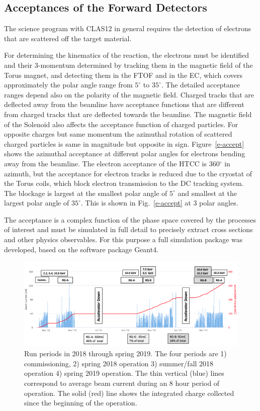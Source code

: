 \documentclass[final,3p,twocolumn]{elsarticle}
\begin{document}
\subsection{\rm Acceptances of the Forward Detectors} 
The science program with CLAS12 in general requires the detection of electrons that are scattered off the target material. 

For determining the kinematics of the reaction, the electrons must be identified and their 3-momentum determined by tracking
them in the magnetic field of the Torus magnet, and detecting them in the FTOF and in the EC, which covers approximately 
the polar angle range from $5^\circ$ to $35^\circ$. The detailed acceptance ranges depend also on the polarity of the 
magnetic field. Charged tracks that are deflected away from the beamline have acceptance functions
that are different from charged tracks that are deflected towards the beamline. The magnetic field of the Solenoid also affects
the acceptance function of charged particles. For opposite charges but same 
momentum the azimuthal rotation of scattered charged particles is same in magnitude but opposite in sign.  
Figure~\ref{e-accept} shows the azimuthal acceptance at different polar angles for electrons bending away from the beamline.  
The electron acceptance of the HTCC is 360$^\circ$ in azimuth, but the acceptance for electron tracks is reduced due to 
the cryostat of the Torus coils, which block electron transmission to the DC tracking system. The blockage is largest  
at the smallest polar angle of $5^\circ$ and smallest at the largest polar angle of  $35^\circ$. This is shown 
in Fig.~\ref{e-accept} at 3 polar angles.  

The acceptance is a complex function of the phase space covered by the processes of interest and must be simulated in 
full detail to precisely extract cross sections and other physics observables.  For this purpose a full simulation package 
was developed, based on the software package Geant4. 


\begin{figure}[htbp!]
\centerline{\includegraphics[width=1.9\columnwidth]{charges-bw.png}}
\caption{Run periods in 2018 through spring 2019. The four periods are 1) commissioning, 2) spring 2018 operation 3) summer/fall 2018 operation 
4) spring 2019 operation. The thin vertical (blue) lines correspond to average beam current during an 8 hour period of operation. The solid (red) line 
shows the integrated charge collected since the beginning of the operation.}
\label{charges}
\end{figure}
\end{document}
